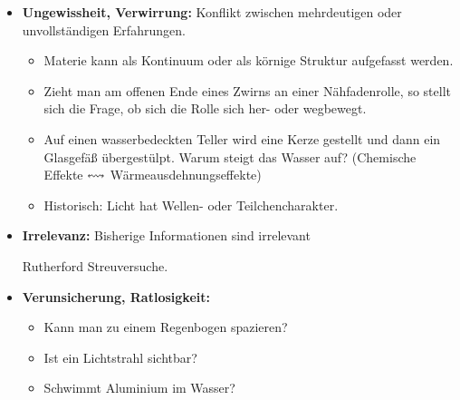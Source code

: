\begin{itemize}
	Zweifel ensteht bez\"{u}glich einer nicht direkt nachpr\"{u}fbaren
	Aussage, weil sie Resultat einer Idealisierung oder theoretischen
	\"{U}berlegung ist.
	
	\begin{beisp2}
		\begin{itemize}
		\item
		Ein reibungsfrei beweglicher Wagen f\"{a}hrt gleichf\"{o}rmig weiter,
		wenn er sich selbst \"{u}berlassen wird.
		\item
		Alle K\"{o}rper (auch Menschen) ziehen einander an.
		\item
		Ein G\"{u}terwagen kann mit der Hand gezogen werden.
		\item
		Wir bewegen uns mit \SI{100}{\kilo\meter\per\hour} um die Erdachse und mit \SI{30}{\meter\per\second}
		um die Sonne.
		\end{itemize}
	\end{beisp2}
	
	
	
	\item {\bf Ungewissheit, Verwirrung:}
	Konflikt zwischen mehrdeutigen oder unvollst\"{a}ndigen Erfahrungen.
	
	\begin{beisp2}
		\begin{itemize}
		\item
		Materie kann als Kontinuum oder als k\"{o}rnige Struktur aufgefasst
		werden.
		\item
		Zieht man am offenen Ende eines Zwirns an einer N\"{a}hfadenrolle,
		so stellt sich die Frage, ob sich die Rolle sich her- oder wegbewegt.
		\item
		Auf einen wasserbedeckten Teller wird eine Kerze gestellt und dann
		ein Glasgef\"{a}{\ss} \"{u}bergest\"{u}lpt.
		Warum steigt das Wasser auf? (Chemische Effekte $\leftrightsquigarrow$
		W\"{a}rmeausdehnungseffekte)
		\item
		Historisch: Licht hat Wellen- oder Teilchencharakter.
		\end{itemize}
	\end{beisp2}
	

	
	\item {\bf Irrelevanz:}
	Bisherige Informationen sind irrelevant
	\begin{beisp}
		Rutherford Streuversuche.
	\end{beisp}
	
	\item {\bf Verunsicherung, Ratlosigkeit:}
	\begin{beisp2}
			\begin{itemize}
		\item
		Kann man zu einem Regenbogen spazieren?
		\item
		Ist ein Lichtstrahl sichtbar?
		\item
		Schwimmt Aluminium im Wasser?
	\end{itemize}
	\end{beisp2}


\end{itemize}
